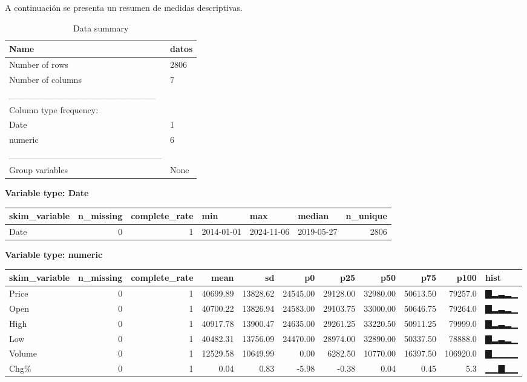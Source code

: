 \documentclass[
]{book}
\begin{document}
A continuación se presenta un resumen de medidas descriptivas.

\begin{table}

\caption{\label{tab:2}Data summary}
\centering
\begin{tabular}[t]{l|l}
\hline
Name & datos\\
\hline
Number of rows & 2806\\
\hline
Number of columns & 7\\
\hline
\_\_\_\_\_\_\_\_\_\_\_\_\_\_\_\_\_\_\_\_\_\_\_ & \\
\hline
Column type frequency: & \\
\hline
Date & 1\\
\hline
numeric & 6\\
\hline
\_\_\_\_\_\_\_\_\_\_\_\_\_\_\_\_\_\_\_\_\_\_\_\_ & \\
\hline
Group variables & None\\
\hline
\end{tabular}
\end{table}

\textbf{Variable type: Date}

\begin{tabular}{l|r|r|l|l|l|r}
\hline
skim\_variable & n\_missing & complete\_rate & min & max & median & n\_unique\\
\hline
Date & 0 & 1 & 2014-01-01 & 2024-11-06 & 2019-05-27 & 2806\\
\hline
\end{tabular}

\textbf{Variable type: numeric}

\begin{tabular}{l|r|r|r|r|r|r|r|r|r|l}
\hline
skim\_variable & n\_missing & complete\_rate & mean & sd & p0 & p25 & p50 & p75 & p100 & hist\\
\hline
Price & 0 & 1 & 40699.89 & 13828.62 & 24545.00 & 29128.00 & 32980.00 & 50613.50 & 79257.0 & ▇▂▃▂▁\\
\hline
Open & 0 & 1 & 40700.22 & 13826.94 & 24583.00 & 29103.75 & 33000.00 & 50646.75 & 79264.0 & ▇▂▃▂▁\\
\hline
High & 0 & 1 & 40917.78 & 13900.47 & 24635.00 & 29261.25 & 33220.50 & 50911.25 & 79999.0 & ▇▂▃▂▁\\
\hline
Low & 0 & 1 & 40482.31 & 13756.09 & 24470.00 & 28974.00 & 32890.00 & 50337.50 & 78888.0 & ▇▂▃▂▁\\
\hline
Volume & 0 & 1 & 12529.58 & 10649.99 & 0.00 & 6282.50 & 10770.00 & 16397.50 & 106920.0 & ▇▁▁▁▁\\
\hline
Chg\% & 0 & 1 & 0.04 & 0.83 & -5.98 & -0.38 & 0.04 & 0.45 & 5.3 & ▁▁▇▁▁\\
\hline
\end{tabular}
\end{document}
